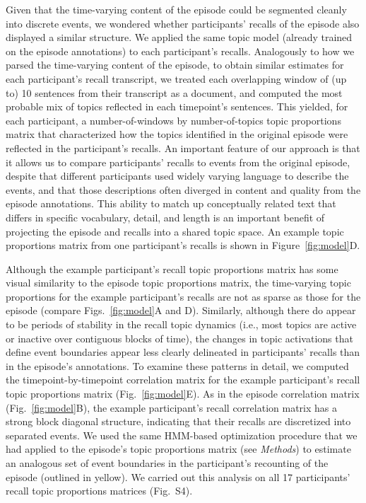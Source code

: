 \documentclass[10pt]{article}
\newcommand{\corrmats}{S4}
\begin{document}
Given that the time-varying content of the episode could be segmented cleanly into discrete events, we wondered whether participants' recalls of the episode also displayed a similar structure.  We applied the same topic model (already trained on the episode annotations) to each participant's recalls.  Analogously to how we parsed the time-varying content of the episode, to obtain similar estimates for each participant's recall transcript, we treated each overlapping  window of (up to) 10 sentences from their transcript as a document, and computed the most probable mix of topics reflected in each timepoint's sentences.  This yielded, for each participant, a number-of-windows by number-of-topics topic proportions matrix that characterized how the topics identified in the original episode were reflected in the participant's recalls.  An important feature of our approach is that it allows us to compare participants' recalls to events from the original episode, despite that different participants used widely varying language to describe the events, and that those descriptions often diverged in content and quality from the episode annotations.  This ability to match up conceptually related text that differs in specific vocabulary, detail, and length is an important benefit of projecting the episode and recalls into a shared topic space.  An example topic proportions matrix from one participant's recalls is shown in Figure~\ref{fig:model}D.

Although the example participant's recall topic proportions matrix has some visual similarity to the episode topic proportions matrix, the time-varying topic proportions for the example participant's recalls are not as sparse as those for the episode (compare Figs.~\ref{fig:model}A and D).  Similarly, although there do appear to be periods of stability in the recall topic dynamics (i.e., most topics are active or inactive over contiguous blocks of time), the changes in topic activations that define event boundaries appear less clearly delineated in participants' recalls than in the episode's annotations.  To examine these patterns in detail, we computed the timepoint-by-timepoint correlation matrix for the example participant's recall topic proportions matrix (Fig.~\ref{fig:model}E).  As in the episode correlation matrix (Fig.~\ref{fig:model}B), the example participant's recall correlation matrix has a strong block diagonal structure, indicating that their recalls are discretized into separated events.  We used the same HMM-based optimization procedure that we had applied to the episode's topic proportions matrix (see \textit{Methods}) to estimate an analogous set of event boundaries in the participant's recounting of the episode (outlined in yellow).  We carried out this analysis on all 17 participants' recall topic proportions matrices (Fig.~\corrmats).
\end{document}
